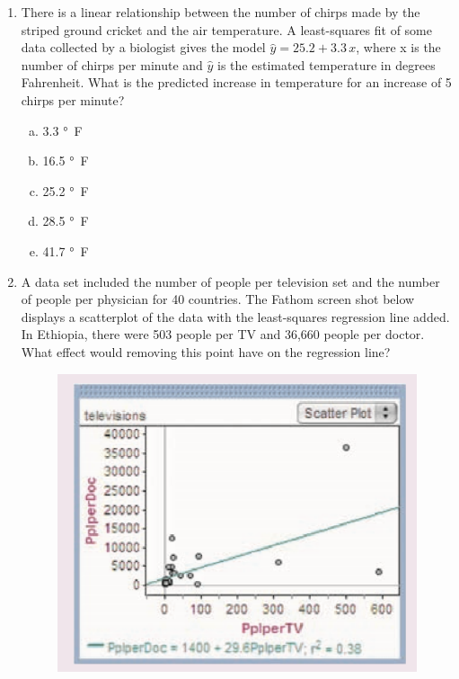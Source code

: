 \documentclass[a4paper,12pt,twoside]{book}
\begin{document}
\begin{enumerate}
    \item There is a linear relationship between the number of chirps made by the striped ground cricket and the air temperature. A least-squares fit of some data collected by a biologist gives the model $\hat{y} =25.2+3.3\,x$, 
 where x is the number of chirps per minute and $\hat{y}$ is the estimated temperature in degrees Fahrenheit. What is the predicted increase in temperature for an increase of 5 chirps per minute?
        \begin{multicols}{5}
        \begin{enumerate}[(a)]
            \item 3.3 \si{\degree\farad}
            \item 16.5 \si{\degree\farad}
            \item 25.2 \si{\degree\farad}
            \item 28.5 \si{\degree\farad}
            \item 41.7 \si{\degree\farad}
        \end{enumerate}
        \end{multicols}
        \vspace{0.3cm}
        
    \item A data set included the number of people per  television set and the number of people per physician for 40 countries. The Fathom screen shot below displays a scatterplot of the data with the least-squares regression line added. In Ethiopia, there were 503 people per TV and 36,660 people per doctor. What effect would removing this point have on the regression line?
        \begin{figure}[H]
            \centering
            \includegraphics[scale=0.6]{figure0207}
        \end{figure}
    

\end{enumerate}
\end{document}
